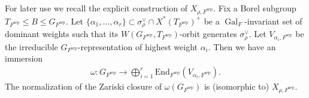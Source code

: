 \documentclass[10pt]{amsart}
\newtheorem{lemma}[theorem]{Lemma}
\theoremstyle{definition}
\newtheorem{remark}[theorem]{Remark}
\numberwithin{equation}{section}
\DeclareMathOperator{\Gal}{\mathrm{Gal}}
\numberwithin{equation}{subsection}
\newcommand{\RR}{\mathbb{R}}
\begin{document}
For later use we recall the explicit construction of $X_{\rho,F^{\mathrm{sep}}}$. Fix a Borel subgroup $T_{F^{\mathrm{sep}}}\le B\le G_{F^{\mathrm{sep}}}$. Let $\{\alpha_1,\ldots,\alpha_r\}\subset \sigma_{\rho}^\vee\cap X^*(T_{F^{\mathrm{sep}}})^+$ be a $\Gal_F$-invariant set of dominant weights such that its $W(G_{F^{\mathrm{sep}}},T_{F^{\mathrm{sep}}})$-orbit  generates $\sigma_{\rho}^\vee$. Let $V_{\alpha_i,F^{\mathrm{sep}}}$ be the irreducible $G_{F^{\mathrm{sep}}}$-representation of highest weight $\alpha_i$. Then we have an immersion
\begin{align}\label{eq:immersion}
    \omega:G_{F^{\mathrm{sep}}}\longrightarrow \bigoplus_{i=1}^r\mathrm{End}_{F^{\mathrm{sep}}}(V_{\alpha_i,F^{\mathrm{sep}}}).
\end{align}
The normalization of the Zariski closure of $\omega(G_{F^{\mathrm{sep}}})$ is (isomorphic to) $X_{\rho,F^{\mathrm{sep}}}$.

\end{document}
